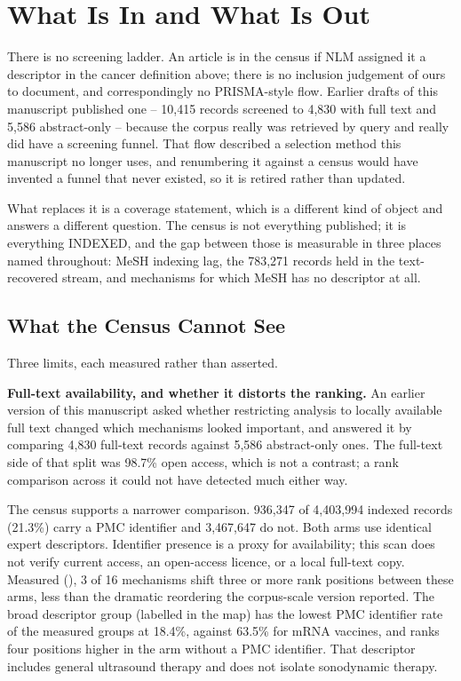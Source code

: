 \documentclass[11pt,twoside,openright]{report}
\begin{document}
\section{What Is In and What Is Out}

There is no screening ladder. An article is in the census if NLM assigned it a
descriptor in the cancer definition above; there is no inclusion judgement of
ours to document, and correspondingly no PRISMA-style flow. Earlier drafts of
this manuscript published one -- 10,415 records screened to 4,830 with full
text and 5,586 abstract-only -- because the corpus really was retrieved by
query and really did have a screening funnel. That flow described a selection
method this manuscript no longer uses, and renumbering it against a census
would have invented a funnel that never existed, so it is retired rather than
updated.

What replaces it is a coverage statement, which is a different kind of object
and answers a different question. The census is not everything published; it is
everything INDEXED, and the gap between those is measurable in three places
named throughout: MeSH indexing lag, the 783,271 records held in the
text-recovered stream, and mechanisms for which MeSH has no descriptor at all.

\subsection{What the Census Cannot See}

Three limits, each measured rather than asserted.

\textbf{Full-text availability, and whether it distorts the ranking.} An earlier
version of this manuscript asked whether restricting analysis to locally
available full text changed which mechanisms looked important, and answered it
by comparing 4,830 full-text records against 5,586 abstract-only ones. The
full-text side of that split was 98.7\% open access, which is not a contrast; a
rank comparison across it could not have detected much either way.

The census supports a narrower comparison. 936,347 of 4,403,994 indexed records
(21.3\%) carry a PMC identifier and 3,467,647 do not. Both arms use identical
expert descriptors. Identifier presence is a proxy for availability; this scan
does not verify current access, an open-access licence, or a local full-text
copy. Measured (), 3 of 16 mechanisms shift three or
more rank positions between these arms, less than the dramatic reordering the
corpus-scale version reported. The broad  descriptor group
(labelled  in the map) has the lowest PMC identifier rate of the
measured groups at 18.4\%, against 63.5\% for mRNA vaccines, and ranks four
positions higher in the arm without a PMC identifier. That descriptor includes
general ultrasound therapy and does not isolate sonodynamic therapy.
\end{document}
